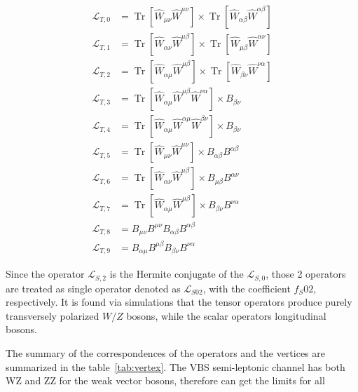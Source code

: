 \begin{itemize}
\begin{equation}
\begin{aligned}
\mathcal{L}_{T, 0} &=\operatorname{Tr}\left[\hat{W}_{\mu \nu} \hat{W}^{\mu \nu}\right] \times \operatorname{Tr}\left[\hat{W}_{\alpha \beta} \hat{W}^{\alpha \beta}\right] \\
\mathcal{L}_{T, 1} &=\operatorname{Tr}\left[\hat{W}_{\alpha \nu} \hat{W}^{\mu \beta}\right] \times \operatorname{Tr}\left[\hat{W}_{\mu \beta} \hat{W}^{\alpha \nu}\right] \\
\mathcal{L}_{T, 2} &=\operatorname{Tr}\left[\hat{W}_{\alpha \mu} \hat{W}^{\mu \beta}\right] \times \operatorname{Tr}\left[\hat{W}_{\beta \nu} \hat{W}^{\nu \alpha}\right] \\
\mathcal{L}_{T, 3} &=\operatorname{Tr}\left[\hat{W}_{\alpha \mu} \hat{W}^{\mu \beta} \hat{W}^{\nu \alpha}\right] \times B_{\beta \nu} \\
\mathcal{L}_{T, 4} &=\operatorname{Tr}\left[\hat{W}_{\alpha \mu} \hat{W}^{\alpha \mu} \hat{W}^{\beta \nu}\right] \times B_{\beta \nu} \\
\mathcal{L}_{T, 5} &=\operatorname{Tr}\left[\hat{W}_{\mu \nu} \hat{W}^{\mu \nu}\right] \times B_{\alpha \beta} B^{\alpha \beta} \\
\mathcal{L}_{T, 6} &=\operatorname{Tr}\left[\hat{W}_{\alpha \nu} \hat{W}^{\mu \beta}\right] \times B_{\mu \beta} B^{\alpha \nu} \\
\mathcal{L}_{T, 7} &=\operatorname{Tr}\left[\hat{W}_{\alpha \mu} \hat{W}^{\mu \beta}\right] \times B_{\beta \nu} B^{\nu \alpha} \\
\mathcal{L}_{T, 8} &=B_{\mu \nu} B^{\mu \nu} B_{\alpha \beta} B^{\alpha \beta} \\
\mathcal{L}_{T, 9} &=B_{\alpha \mu} B^{\mu \beta} B_{\beta \nu} B^{\nu \alpha}
\end{aligned}
\end{equation}
\end{itemize}

Since the operator $\mathcal{L}_{S, 2}$ is the Hermite conjugate of the $\mathcal{L}_{S, 0}$, those 2 operators are treated as single operator denoted as $\mathcal{L}_{S02}$, with the coefficient $f_S02$, respectively. It is found via simulations that the tensor operators produce purely transversely polarized $W/Z$ bosons, while the scalar operators longitudinal bosons.

The summary of the correspondences of the operators and the vertices are summarized in the table~\ref{tab:vertex}. The VBS semi-leptonic channel has both WZ and ZZ for the weak vector bosons, therefore can get the limits for all 

